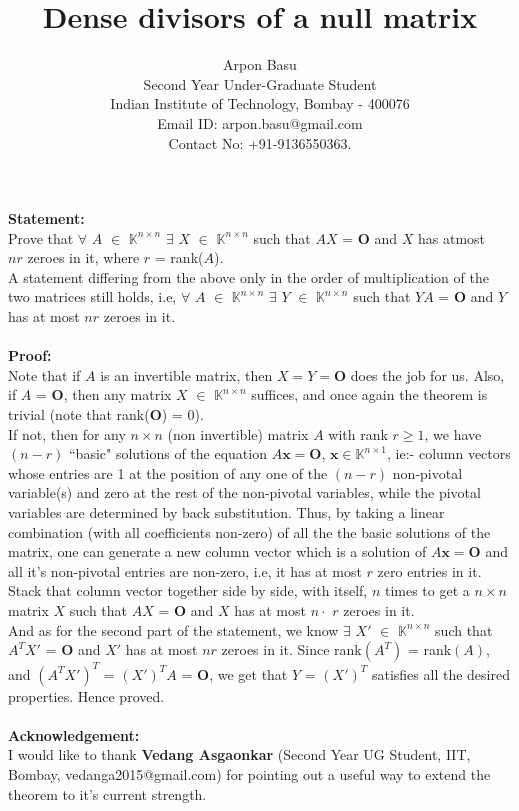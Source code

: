 \documentclass{article}
\title{\textbf{Dense divisors of a null matrix}}
\author{ Arpon Basu \\ Second Year Under-Graduate Student \\
Indian Institute of Technology, Bombay - 400076\\
    Email ID: arpon.basu@gmail.com \\
    Contact No: +91-9136550363.
}
\date{}
\begin{document}
\maketitle
\noindent
{\bf Statement:}\\ 
Prove that $\forall$ $A$ $\in$ $\mathbb{K}^{n\times n}$ $\exists$ $X$ $\in$ $\mathbb{K}^{n\times n}$ such that $AX$ = $\textbf{O}$ and $X$ has atmost \\
$nr$ zeroes in it, where $r$ = rank($A$).\\
A statement differing from the above only in the order of multiplication of the two matrices still holds, i.e, $\forall$ $A$ $\in$ $\mathbb{K}^{n\times n}$ $\exists$ $Y$ $\in$ $\mathbb{K}^{n\times n}$ such that $YA$ = $\textbf{O}$ and $Y$ has at most $n r$ zeroes in it. \\ \\
\noindent
{\bf Proof:}\\ 
Note that if $A$ is an invertible matrix, then $X = Y = \textbf{O}$ does the job for us.
Also, if $A$ = $\textbf{O}$, then any matrix $X$ $\in$ $\mathbb{K}^{n\times n}$ suffices, and once again the theorem is trivial (note that rank($\textbf{O}$) = 0).\\
If not, then for any $n\times n$ (non invertible) matrix $A$ with rank $r \geq 1$, we have $(n - r)$ ``basic" solutions of the equation $A\textbf{x} = \textbf{O}$, $\textbf{x} \in \mathbb{K}^{n\times 1}$, ie:- column vectors whose entries are 1 at the position of any one of the $(n - r)$ non-pivotal variable(s) and zero at the rest of the non-pivotal variables, while the pivotal variables are determined by back substitution. Thus, by taking a linear combination (with all coefficients non-zero) of all the the basic solutions of the matrix, one can generate a new column vector which is a solution of $A\textbf{x} = \textbf{O}$ and all it's non-pivotal entries are non-zero, i.e, it has at most $r$ zero entries in it. Stack that column vector together side by side, with itself, $n$ times to get a $n\times n$ matrix $X$ such that $AX$ = $\textbf{O}$ and $X$ has at most $n\cdot$ $r$ zeroes in it.\\
And as for the second part of the statement, we know $\exists$ $X'$ $\in$ $\mathbb{K}^{n\times n}$ such that $A^{T}X'$ = $\textbf{O}$ and $X'$ has at most $n r$ zeroes in it. Since rank$(A^{T})$ = rank$(A)$, and $(A^{T}X')^{T}$ = $(X')^{T}A$ = $\textbf{O}$, we get that $Y$ = $(X')^{T}$ satisfies all the desired properties.
Hence proved.\\ \\
\noindent
{\bf Acknowledgement:}\\
I would like to thank \textbf{Vedang Asgaonkar} (Second Year UG Student, IIT, Bombay, vedanga2015@gmail.com) for pointing out a useful way to extend the theorem to it's current strength.



\end{document}
